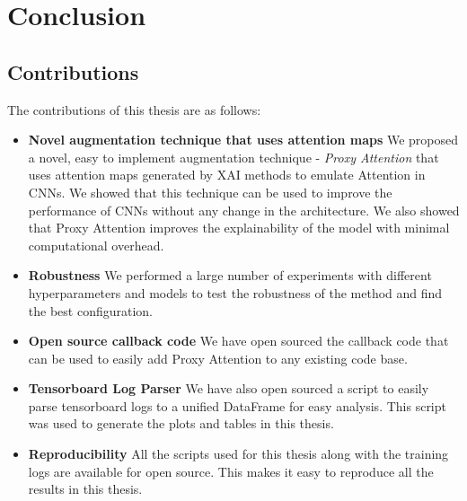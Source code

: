 \chapter{Conclusion} \label{ch:conclusion}
\section{Contributions}
The contributions of this thesis are as follows:
\begin{itemize}
    \item \textbf{Novel augmentation technique that uses attention maps} We proposed a novel, easy to implement augmentation technique - \textit{Proxy Attention} that uses attention maps generated by XAI methods to emulate Attention in CNNs. We showed that this technique can be used to improve the performance of CNNs without any change in the architecture. We also showed that Proxy Attention improves the explainability of the model with minimal computational overhead.
    \item \textbf{Robustness} We performed a large number of experiments with different hyperparameters and models to test the robustness of the method and find the best configuration. 
    \item \textbf{Open source callback code} We have open sourced the callback code that can be used to easily add Proxy Attention to any existing code base.
    \item \textbf{Tensorboard Log Parser} We have also open sourced a script to easily parse tensorboard logs to a unified DataFrame for easy analysis. This script was used to generate the plots and tables in this thesis.
    \item \textbf{Reproducibility} All the scripts used for this thesis along with the training logs are available for open source. This makes it easy to reproduce all the results in this thesis.
\end{itemize}


